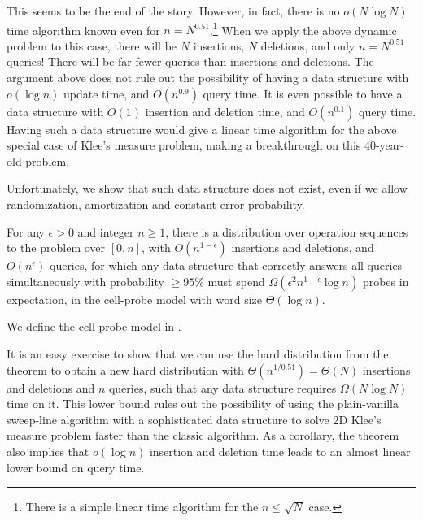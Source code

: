 \documentclass[11pt]{article}
\begin{document}
This seems to be the end of the story. However, in fact, there is no $o(N\log N)$ time algorithm known even for $n=N^{0.51}$.\footnote{There is a simple linear time algorithm for the $n\leq \sqrt{N}$ case.} When we apply the above dynamic problem to this case, there will be $N$ insertions, $N$ deletions, and only $n=N^{0.51}$ queries! There will be far fewer queries than insertions and deletions. The argument above does not rule out the possibility of having a \diu{} data structure with $o(\log n)$ update time, and $O(n^{0.9})$ query time. It is even possible to have a data structure with $O(1)$ insertion and deletion time, and $O(n^{0.1})$ query time. Having such a data structure would give a linear time algorithm for the above special case of Klee's measure problem, making a breakthrough on this 40-year-old problem. 

Unfortunately, we show that such data structure does not exist, even if we allow randomization, amortization and constant error probability. 

\begin{theorem}\label{thmdiu}
	For any $\epsilon>0$ and integer $n\geq 1$, there is a distribution over operation sequences to the \diu{} problem over $[0, n]$, with $O(n^{1-\epsilon})$ insertions and deletions, and $O(n^{\epsilon})$ queries, for which any data structure that correctly answers all queries simultaneously with probability $\geq 95\%$ must spend $\Omega(\epsilon^2 n^{1-\epsilon}\log n)$ probes in expectation, in the cell-probe model with word size $\Theta(\log n)$. 
\end{theorem}
We define the cell-probe model in \iftoggle{conf}{Appendix~\ref{sectcp_app}}{Section~\ref{subsectcp}}. 

It is an easy exercise to show that we can use the hard distribution from the theorem to obtain a new hard distribution with $\Theta(n^{1/0.51})=\Theta(N)$ insertions and deletions and $n$ queries, such that any data structure requires $\Omega(N\log N)$ time on it. This lower bound rules out the possibility of using the plain-vanilla sweep-line algorithm with a sophisticated data structure to solve 2D Klee's measure problem faster than the classic algorithm. As a corollary, the theorem also implies that $o(\log n)$ insertion and deletion time leads to an almost linear lower bound on query time. 
\end{document}
